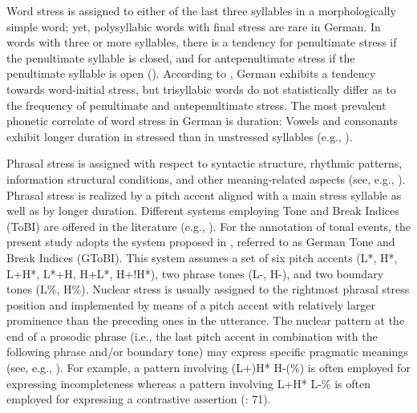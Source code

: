 \documentclass[output=paper]{langscibook}
\begin{document}
Word stress is assigned to either of the last three syllables in a morphologically simple word; yet, polysyllabic words with final stress are rare in German. In words with three or more syllables, there is a tendency for penultimate stress if the penultimate syllable is closed, and for antepenultimate stress if the penultimate syllable is open (\citealt{Wiese1996}). According to \citet{Delattre1965}, German exhibits a tendency towards word-initial stress, but trisyllabic words do not statistically differ as to the frequency of penultimate and antepenultimate stress. The most prevalent phonetic correlate of word stress in German is duration: Vowels and consonants exhibit longer duration in stressed than in unstressed syllables (e.g., \citealt{DogilWilliams1999}). %

Phrasal stress is assigned with respect to syntactic structure, rhythmic patterns, information structural conditions, and other meaning-related aspects (see, e.g., \citealt{Truckenbrodt2006}). Phrasal stress is realized by a pitch accent aligned with a main stress syllable as well as by longer duration. Different systems employing Tone and Break Indices (ToBI) are offered in the literature (e.g., \citealt{GriceEtal2005, Peters2018}). For the annotation of tonal events, the present study adopts the system proposed in \citet{GriceEtal2005}, referred to as German Tone and Break Indices (GToBI). This system assumes a set of six pitch accents (L*, H*, L+H*, L*+H, H+L*, H+!H*), two phrase tones (L-, H-), and two boundary tones (L\%, H\%). Nuclear stress is usually assigned to the rightmost phrasal stress position and implemented by means of a pitch accent with relatively larger prominence than the preceding ones in the utterance. The nuclear pattern at the end of a prosodic phrase (i.e., the last pitch accent in combination with the following phrase and\slash or boundary tone) may express specific pragmatic meanings (see, e.g., \citealt{GriceEtal2005}). For example, a pattern involving (L+)H* H-(\%) is often employed for expressing incompleteness whereas a pattern involving L+H* L-\% is often employed for expressing a contrastive assertion (\citealt{GriceEtal2005}: 71).
\end{document}
